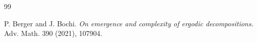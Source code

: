 \documentclass[11pt,a4paper,reqno]{amsart}
\theoremstyle{plain}
\theoremstyle{definition}
\begin{document}
\begin{thebibliography}{99}






P. Berger and J. Bochi.
\newblock \emph{On emergence and complexity of ergodic decompositions.}
\newblock Adv. Math. 390 (2021), 107904.









\end{thebibliography}
\end{document}
